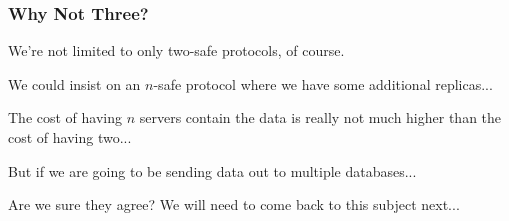 \begin{frame}
\frametitle{Why Not Three?}

We're not limited to only two-safe protocols, of course. 

We could insist on an $n$-safe protocol where we have some additional replicas... 

The cost of having $n$ servers contain the data is really not much higher than the cost of having two...

But if we are going to be sending data out to multiple databases... 

Are we sure they agree? We will need to come back to this subject next...


\end{frame}




